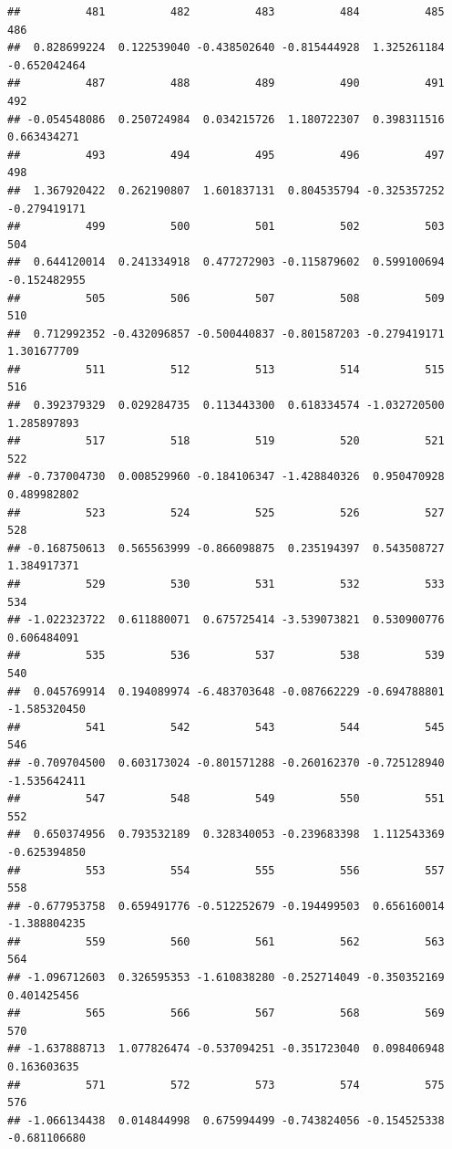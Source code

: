 \documentclass[
]{article}
\begin{document}
\begin{verbatim}
##          481          482          483          484          485          486 
##  0.828699224  0.122539040 -0.438502640 -0.815444928  1.325261184 -0.652042464 
##          487          488          489          490          491          492 
## -0.054548086  0.250724984  0.034215726  1.180722307  0.398311516  0.663434271 
##          493          494          495          496          497          498 
##  1.367920422  0.262190807  1.601837131  0.804535794 -0.325357252 -0.279419171 
##          499          500          501          502          503          504 
##  0.644120014  0.241334918  0.477272903 -0.115879602  0.599100694 -0.152482955 
##          505          506          507          508          509          510 
##  0.712992352 -0.432096857 -0.500440837 -0.801587203 -0.279419171  1.301677709 
##          511          512          513          514          515          516 
##  0.392379329  0.029284735  0.113443300  0.618334574 -1.032720500  1.285897893 
##          517          518          519          520          521          522 
## -0.737004730  0.008529960 -0.184106347 -1.428840326  0.950470928  0.489982802 
##          523          524          525          526          527          528 
## -0.168750613  0.565563999 -0.866098875  0.235194397  0.543508727  1.384917371 
##          529          530          531          532          533          534 
## -1.022323722  0.611880071  0.675725414 -3.539073821  0.530900776  0.606484091 
##          535          536          537          538          539          540 
##  0.045769914  0.194089974 -6.483703648 -0.087662229 -0.694788801 -1.585320450 
##          541          542          543          544          545          546 
## -0.709704500  0.603173024 -0.801571288 -0.260162370 -0.725128940 -1.535642411 
##          547          548          549          550          551          552 
##  0.650374956  0.793532189  0.328340053 -0.239683398  1.112543369 -0.625394850 
##          553          554          555          556          557          558 
## -0.677953758  0.659491776 -0.512252679 -0.194499503  0.656160014 -1.388804235 
##          559          560          561          562          563          564 
## -1.096712603  0.326595353 -1.610838280 -0.252714049 -0.350352169  0.401425456 
##          565          566          567          568          569          570 
## -1.637888713  1.077826474 -0.537094251 -0.351723040  0.098406948  0.163603635 
##          571          572          573          574          575          576 
## -1.066134438  0.014844998  0.675994499 -0.743824056 -0.154525338 -0.681106680 

\end{verbatim}
\end{document}
